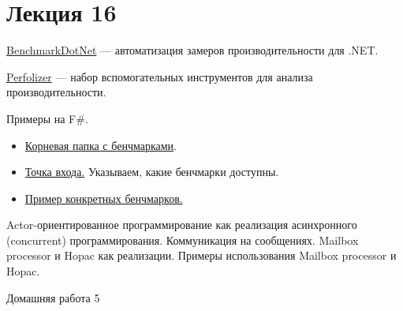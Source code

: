 \section{Лекция 16}

\href{https://github.com/dotnet/BenchmarkDotNet}{BenchmarkDotNet} --- автоматизация замеров производительности для .NET.

\href{https://github.com/AndreyAkinshin/perfolizer}{Perfolizer} --- набор вспомогательных инструментов для анализа производительности.

Примеры на F\#.
\begin{itemize}
    \item \href{https://github.com/YaccConstructor/GraphBLAS-sharp/tree/dev/benchmarks/GraphBLAS-sharp.Benchmarks}{Корневая папка с бенчмарками}. 
    \item \href{https://github.com/YaccConstructor/GraphBLAS-sharp/blob/dev/benchmarks/GraphBLAS-sharp.Benchmarks/Program.fs}{Точка входа.} Указываем, какие бенчмарки доступны.
    \item \href{https://github.com/YaccConstructor/GraphBLAS-sharp/blob/dev/benchmarks/GraphBLAS-sharp.Benchmarks/BenchmarksEWiseAdd.fs}{Пример конкретных бенчмарков.}
\end{itemize}


Actor-ориентированное программирование как реализация асинхронного (concurrent) программирования. Коммуникация на сообщениях. Mailbox processor и Hopac как реализации. Примеры использования Mailbox processor и Hopac.

Домашняя работа 5

